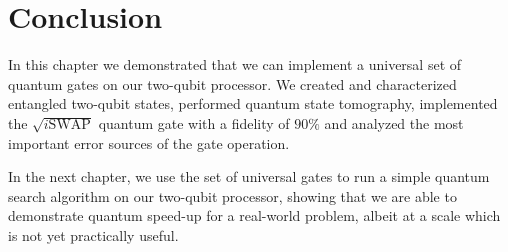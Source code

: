 \section{Conclusion}

In this chapter we demonstrated that we can implement a universal set of quantum gates on our two-qubit processor. We created and characterized entangled two-qubit states, performed quantum state tomography, implemented the $\sqrt{i\mathrm{SWAP}}$ quantum gate with a fidelity of $90\%$ and analyzed the most important error sources of the gate operation.

\smallskip

In the next chapter, we use the set of universal gates to run a simple quantum search algorithm on our two-qubit processor, showing that we are able to demonstrate quantum speed-up for a real-world problem, albeit at a scale which is not yet practically useful.
